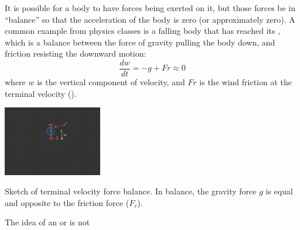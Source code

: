 It is possible for a body to have forces being exerted on it, but those forces be in ``balance'' so that the acceleration of the body is zero (or approximately zero).  A common example from physics classes is a falling body that has reached its , which is a balance between the force of gravity pulling the body down, and friction resisting the downward motion:
\begin{equation}
    \frac{dw}{dt} = -g + Fr \approx 0
\end{equation}
where $w$ is the vertical component of velocity, and $Fr$ is the wind friction at the terminal velocity ().  

\begin{marginfigure}
    \includegraphics[width=1.7in]{figs/Coriolis/TermVel}
    \caption{Sketch of terminal velocity force balance.  In balance, the gravity force $g$ is equal and opposite to the friction force ($F_r$).}
    \label{fig:TermVel}
\end{marginfigure}

The idea of an  or  is not 

